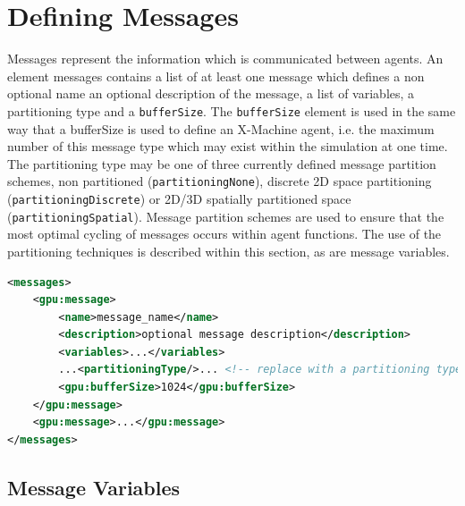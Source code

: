 \documentclass[11pt, a4paper, onecolumn, oneside]{report}
\begin{document}
\section{Defining Messages}
\label{sec:24}


Messages represent the information which is communicated between agents.
An element messages contains a list of at least one message which defines a non optional name an optional description of the message, a list of variables, a partitioning type and a \texttt{bufferSize}.
The \texttt{bufferSize} element is used in the same way that a bufferSize is used to define an X-Machine agent, i.e. the maximum number of this message type which may exist within the simulation at one time.
The partitioning type may be one of three currently defined message partition schemes, non partitioned (\texttt{partitioningNone}), discrete 2D space partitioning (\texttt{partitioningDiscrete}) or 2D/3D spatially partitioned space (\texttt{partitioningSpatial}).
Message partition schemes are used to ensure that the most optimal cycling of messages occurs within agent functions. The use of the partitioning techniques is described within this section, as are message variables.

\begin{lstlisting}[language=XML]
<messages>
    <gpu:message>
        <name>message_name</name>
        <description>optional message description</description>
        <variables>...</variables>
        ...<partitioningType/>... <!-- replace with a partitioning type -->
        <gpu:bufferSize>1024</gpu:bufferSize>
    </gpu:message>
    <gpu:message>...</gpu:message>
</messages>
\end{lstlisting}

\subsection{Message Variables}
\label{sec:241}
\end{document}
